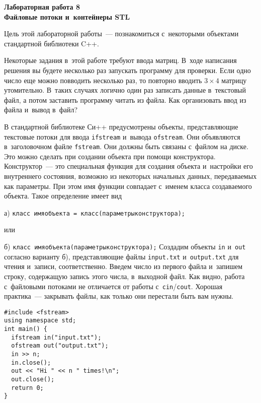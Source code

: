 \documentclass{article}
\begin{document}
\renewcommand{\leq}{\leqslant}
\renewcommand{\geq}{\geqslant}
\noindent
\textbf{Лабораторная работа 8}\\
{\Large \textbf{Файловые потоки и~контейнеры STL}}\\
\strut\hfill{}

Цель этой лабораторной работы~— познакомиться с~некоторыми объектами стандартной библиотеки C++.

Некоторые задания в~этой работе требуют ввода матриц. В~ходе написания решения вы будете несколько раз запускать программу для проверки. Если одно число еще можно повводить несколько раз, то повторно вводить $3\times4$ матрицу утомительно. В~таких случаях логично один раз записать данные в~текстовый файл, а потом заставить программу читать из файла. Как организовать ввод из файла и~вывод в~файл? 

В стандартной библиотеке Си++ предусмотрены объекты, представляющие текстовые потоки для ввода \texttt{ifstream} и~вывода \texttt{ofstream}. Они объявляются в~заголовочном файле \texttt{fstream}. Они должны быть связаны с~файлом на диске. Это можно сделать при создании объекта при помощи конструктора. Конструктор~— это специальная функция для создания объекта и~настройки его внутреннего состояния, возможно из некоторых начальных данных, передаваемых как параметры. При этом имя функции совпадает с~именем класса создаваемого объекта. Такое определение имеет вид
\trivlist
\item
  \strut\quad а) \texttt{{\color[rgb]{0.17,0.57,0.69}класс} имяобъекта = {\color[rgb]{0.17,0.57,0.69}класс}({\color[rgb]{0.64,0.08,0.08}параметрыконструктора});}
\item 
  или 
\item
  \strut\quad б) \texttt{{\color[rgb]{0.17,0.57,0.69}класс} имяобъекта({\color[rgb]{0.64,0.08,0.08}параметрыконструктора});}
\endtrivlist
Создадим объекты \texttt{in} и~\texttt{out} согласно варианту б), представляющие файлы \texttt{input.txt} и~\texttt{output.txt} для чтения и~записи, соответственно. Введем число из первого файла и~запишем строку, содержащую запись этого числа, в~выходной файл. Как видно, работа с~файловыми потоками не отличается от работы с~\texttt{cin}/\texttt{cout}. Хорошая практика~— закрывать файлы, как только они перестали быть вам нужны.
\begin{verbatim}
#include <fstream>
using namespace std;
int main() {
  ifstream in("input.txt");
  ofstream out("output.txt");
  in >> n;
  in.close();
  out << "Hi " << n " times!\n";
  out.close();
  return 0;
}
\end{verbatim}
\end{document}
